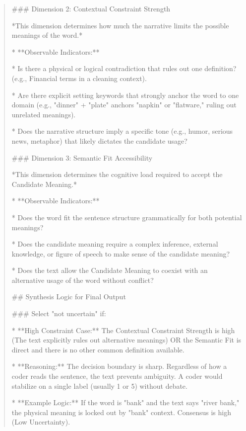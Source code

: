 \begin{quote}
### Dimension 2: Contextual Constraint Strength

*This dimension determines how much the narrative limits the possible meanings of the word.*

*   **Observable Indicators:**

    *   Is there a physical or logical contradiction that rules out one definition? (e.g., Financial terms in a cleaning context).

    *   Are there explicit setting keywords that strongly anchor the word to one domain (e.g., "dinner" + "plate" anchors "napkin" or "flatware," ruling out unrelated meanings).

    *   Does the narrative structure imply a specific tone (e.g., humor, serious news, metaphor) that likely dictates the candidate usage?



### Dimension 3: Semantic Fit Accessibility

*This dimension determines the cognitive load required to accept the Candidate Meaning.*

*   **Observable Indicators:**

    *   Does the word fit the sentence structure grammatically for both potential meanings?

    *   Does the candidate meaning require a complex inference, external knowledge, or figure of speech to make sense of the candidate meaning?

    *   Does the text allow the Candidate Meaning to coexist with an alternative usage of the word without conflict?



## Synthesis Logic for Final Output



### Select "not uncertain" if:

*   **High Constraint Case:** The Contextual Constraint Strength is high (The text explicitly rules out alternative meanings) OR the Semantic Fit is direct and there is no other common definition available.

*   **Reasoning:** The decision boundary is sharp. Regardless of how a coder reads the sentence, the text prevents ambiguity. A coder would stabilize on a single label (usually 1 or 5) without debate.

*   **Example Logic:** If the word is "bank" and the text says "river bank," the physical meaning is locked out by "bank" context. Consensus is high (Low Uncertainty).




\end{quote}
